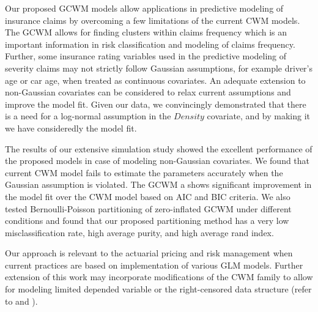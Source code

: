\documentclass[12pt,letterpaper]{article}
\numberwithin{equation}{section}
\numberwithin{equation}{section}
\numberwithin{equation}{section}
\begin{document}
Our proposed GCWM models allow applications in predictive modeling of insurance claims by overcoming a few limitations of the current CWM models. The GCWM allows for finding clusters within claims frequency which is an important information in risk classification and modeling of claims frequency. Further, some insurance rating variables used in the predictive modeling of severity claims may not strictly follow Gaussian assumptions, for example driver's age or car age, when treated as continuous covariates. An adequate extension to non-Gaussian covariates can be considered to relax current assumptions and improve the model fit. Given our data, we convincingly demonstrated that there is a need for a log-normal assumption in the $Density$ covariate, and by making it we have consideredly the model fit. 

The results of our extensive simulation study showed the excellent performance of the proposed models in case of modeling non-Gaussian covariates. We found  that current CWM model fails to estimate the parameters accurately when the Gaussian assumption is violated. The GCWM a shows significant improvement in the model fit over the CWM model based on AIC and BIC criteria. We also tested Bernoulli-Poisson partitioning of zero-inflated GCWM under different conditions and found that our proposed partitioning method has a very low misclassification rate, high average purity, and high average rand index.

Our approach is relevant to the actuarial pricing and risk management when current practices are based on implementation of various GLM models. Further extension of this work may incorporate modifications of the CWM family to allow for modeling limited depended variable or the right-censored data structure (refer to \cite{miljkovic2015} and \cite{miljkovic+orr:2017}).



\appendix
\end{document}
